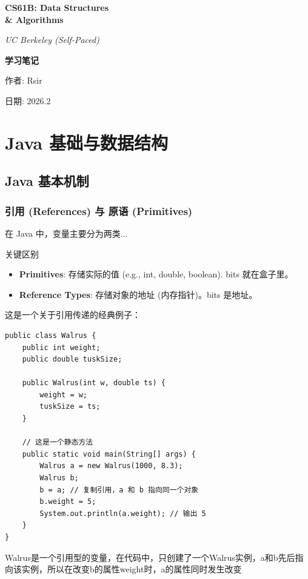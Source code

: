\documentclass[12pt, a4paper, openany]{ctexbook} %
\begin{document}
\begin{titlepage}
    \centering
    \vspace*{2cm}
    {\Huge \bfseries CS61B: Data Structures \\ \& Algorithms \par}
    \vspace{1cm}
    {\Large \itshape UC Berkeley (Self-Paced) \par}
    \vspace{3cm}
    {\Large \bfseries 学习笔记 \par}
    \vspace{3cm}
    {\large 作者: Rsir \par}
    {\large 日期: 2026.2}
\end{titlepage}

\tableofcontents
\newpage


\part{Java 基础与数据结构}
\chapter{Java 基本机制}
\section{引用 (References) 与 原语 (Primitives)}
在 Java 中，变量主要分为两类...

\begin{concept}{关键区别}
    \begin{itemize}
        \item \textbf{Primitives}: 存储实际的值 (e.g., int, double, boolean). bits 就在盒子里。
        \item \textbf{Reference Types}: 存储对象的地址 (内存指针)。bits 是地址。
    \end{itemize}
\end{concept}

这是一个关于引用传递的经典例子：

\begin{lstlisting}[caption={Walrus.java}]
public class Walrus {
    public int weight;
    public double tuskSize;

    public Walrus(int w, double ts) {
        weight = w;
        tuskSize = ts;
    }

    // 这是一个静态方法
    public static void main(String[] args) {
        Walrus a = new Walrus(1000, 8.3);
        Walrus b;
        b = a; // 复制引用，a 和 b 指向同一个对象
        b.weight = 5;
        System.out.println(a.weight); // 输出 5
    }
}
\end{lstlisting}
Walrus是一个引用型的变量，在代码中，只创建了一个Walrus实例，a和b先后指向该实例，所以在改变b的属性weight时，a的属性同时发生改变
\end{document}
